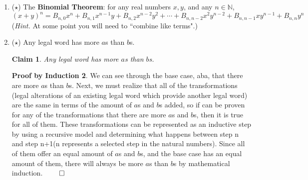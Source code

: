 \documentclass[11pt]{letter}
\newtheorem{claim}{Claim}
\theoremstyle{definition}
\newtheorem{PBI}{Proof by Induction}
\begin{document}
\begin{description}
\begin{enumerate}
\begin{PBI}
                            \begin{align*}
                              \frac{d^{k+1}}{dx^{k+1}}f+\frac{d^{k+1}}{dx^{k+1}}g &= \frac{d^{k+1}}{dx^{k+1}}[f+g] \\
                              &=\frac{d}{dx}\frac{d^k}{dx^k}[f+g] \\
                              &=\frac{d}{dx}\frac{d^k}{dx^k}f+\frac{d}{dx^k}g \tag{Substituted using the inductive assumption}\\
                              &=\frac{d^{k+1}}{dx^{k+1}}f+\frac{d^{k+1}}{dx^{k+1}}g \\
                              \end{align*}
                            Therefore, since $\frac{d^n}{dx^n}\left[f+g\right]=\frac{d^n}{dx^n}f+\frac{d^n}{dx^n}g$ is true in the base case of n=1 and for n+1, through mathematical induction this is true. $\qed$


                          \end{PBI}
			\item ($\star$) The {\bfseries Binomial Theorem}: for any real numbers $x,y$, and any $n\in\mathbb{N}$,
				\begin{equation*}
					(x+y)^n=B_{n,0}x^n +B_{n,1}x^{n-1}y+B_{n,2}x^{n-2}y^2+\cdots+B_{n,n-2}x^2y^{n-2}+B_{n,n-1}x y^{n-1}+B_{n,n}y^n
				\end{equation*}
				({\em Hint.} At some point you will need to ``combine like terms".)
			\item ($\star$) Any legal word has more $a$s than $b$s.
\begin{claim}
Any legal word has more $a$s than $b$s.
\end{claim}
\begin{PBI}
We can see through the base case, aba, that there are more $a$s than $b$s. Next, we must realize that all of the transformations (legal alterations of an existing legal word which provide another legal word) are the same in terms of the amount of $a$s and $b$s added, so if can be proven for any of the transformations that there are more $a$s and $b$s, then it is true for all of them. These transformations can be represented as an inductive step by using a recursive model and determining what happens between step n and step n+1(n represents a selected step in the natural numbers). Since all of them offer an equal amount of $a$s and $b$s, and the base case has an equal amount of them, there will always be more $a$s than $b$s by mathematical induction. $\qed$ 
\end{PBI}
			\end{enumerate}
\end{description}
\end{document}
